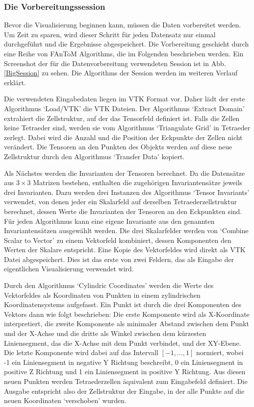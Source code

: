 \documentclass[a4paper,fontsize=12pt,toc=bib,halfparskip]{scrartcl}
\begin{document}
\subsubsection{Die Vorbereitungssession}
Bevor die Visualisierung beginnen kann, m\"ussen die Daten vorbereitet werden. Um Zeit zu sparen, wird dieser Schritt f\"ur jeden Datensatz nur einmal durchgef\"uhrt und die Ergebnisse abgespeichert. Die Vorbereitung geschieht durch eine Reihe von FAnToM Algorithms, die im Folgenden beschrieben werden. Ein Screenshot der f\"ur die Datenvorbereitung verwendeten Session ist in Abb. \ref{BigSession} zu sehen. Die Algorithms der Session werden im weiteren Verlauf erkl\"art.

Die verwendeten Eingabedaten liegen im VTK Format\cite{avila2010vtk} vor. Daher l\"adt der erste Algorithmus `Load/VTK' die VTK Dateien. Der Algorithmus `Extract Domain' extrahiert die Zellstruktur, auf der das Tensorfeld definiert ist. Falls die Zellen keine Tetraeder sind, werden sie vom Algorithmus `Triangulate Grid' in Tetraeder zerlegt. Dabei wird die Anzahl und die Position der Eckpunkte der Zellen nicht ver\"andert. Die Tensoren an den Punkten des Objekts werden auf diese neue Zellstruktur durch den Algorithmus `Transfer Data' kopiert. 

Als N\"achstes werden die Invarianten der Tensoren berechnet. Da die Datens\"atze aus $3\times3$ Matrizen bestehen, enthalten die zugeh\"origen Invariantens\"atze jeweils drei Invarianten. Dazu werden drei Instanzen des Algorithmus `Tensor Invariants' verwendet, von denen jeder ein Skalarfeld auf derselben Tetraederzellstruktur berechnet, dessen Werte die Invarianten der Tensoren an den Eckpunkten sind. F\"ur jeden Algorithmus kann eine eigene Invariante aus den genannten Invariantens\"atzen ausgew\"ahlt werden. Die drei Skalarfelder werden von `Combine Scalar to Vector' zu einem Vektorfeld kombiniert, dessen Komponenten den Werten der Skalare entspricht. Eine Kopie des Vektorfeldes wird direkt als VTK Datei abgespeichert. Dies ist das erste von zwei Feldern, das als Eingabe der eigentlichen Visualisierung verwendet wird.

Durch den Algorithmus `Cylindric Coordinates' werden die Werte des Vektorfeldes als Koordinaten von Punkten in einem zylindrischen Koordinatensystems aufgefasst. Ein Punkt ist durch die drei Komponenten des Vektors dann wie folgt beschrieben: Die erste Komponente wird als X-Koordinate interpretiert, die zweite Komponente als minimaler Abstand zwischen dem Punkt und der X-Achse und die dritte als Winkel zwischen dem k\"urzesten Liniensegment, das die X-Achse mit dem Punkt verbindet, und der XY-Ebene. Die letzte Komponente wird dabei auf das Intervall $[-1,\dots,1]$ normiert, wobei -1 ein Liniensegment in negative Y Richtung beschreibt, 0 ein Liniensegment in positive Z Richtung und 1 ein Liniensegment in positive Y Richtung. Aus diesen neuen Punkten werden Tetraederzellen \"aquivalent zum Eingabefeld definiert. Die Ausgabe entspricht also der Zellstruktur der Eingabe, in der alle Punkte auf die neuen Koordinaten `verschoben' wurden.
\end{document}
